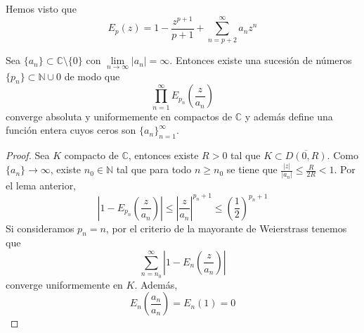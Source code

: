 \begin{remark}
    Hemos visto que
    $$E_p(z) = 1 - \frac{z^{p+1}}{p+1} + \sum_{n=p+2}^\infty a_nz^n$$
\end{remark}

\begin{theorem}
    Sea $\{a_n\} \subset \mathbb{C} \setminus \{0\}$ con $\lim\limits_{n \to \infty} |a_n| = \infty$.
    Entonces existe una sucesión de números $\{p_n\} \subset \mathbb{N} \cup 0$ de modo que
    $$\prod_{n=1}^\infty E_{p_n}\left(\frac{z}{a_n}\right)$$
    converge absoluta y uniformemente en compactos de $\mathbb{C}$ y además define una función entera cuyos ceros son $\{a_n\}_{n=1}^\infty$.
\end{theorem}

\begin{proof}
    Sea $K$ compacto de $\mathbb{C}$, entonces existe $R > 0$ tal que $K \subset \overline{D(0, R)}$.
    Como $\{a_n\} \to \infty$, existe $n_0 \in \mathbb{N}$ tal que para todo $n \geq n_0$ se tiene que $\frac{|z|}{|a_n|} \leq \frac{R}{2R} < 1$.
    Por el lema anterior,
    $$\left|1-E_{p_n}\left(\frac{z}{a_n}\right)\right| \leq \left|\frac{z}{a_n}\right|^{p_n+1} \leq \left(\frac{1}{2}\right)^{p_n+1}$$
    Si consideramos $p_n = n$, por el criterio de la mayorante de Weierstrass tenemos que
    $$\sum_{n=n_0}^\infty \left|1-E_n\left(\frac{z}{a_n}\right)\right|$$
    converge uniformemente en $K$.
    Además,
    $$E_n\left(\frac{a_n}{a_n}\right) = E_n(1) = 0$$
\end{proof}